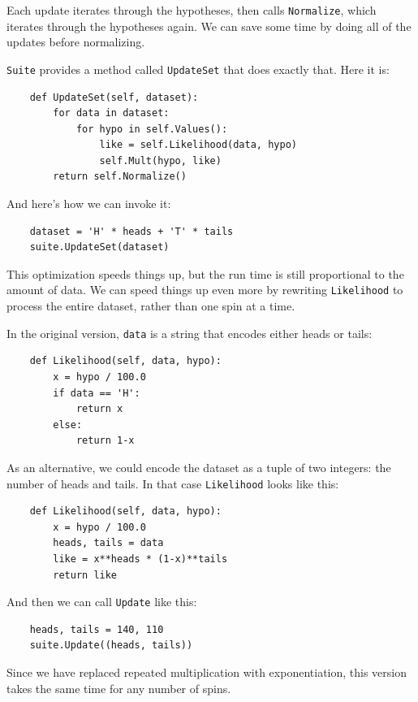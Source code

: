 \documentclass[12pt]{book}
\begin{document}
Each update iterates through the hypotheses, then calls \verb"Normalize",
which iterates through the hypotheses again.  We can save some
time by doing all of the updates before normalizing.

\verb"Suite" provides a method called \verb"UpdateSet" that does
exactly that.  Here it is:

\begin{verbatim}
    def UpdateSet(self, dataset):
        for data in dataset:
            for hypo in self.Values():
                like = self.Likelihood(data, hypo)
                self.Mult(hypo, like)
        return self.Normalize()
\end{verbatim}

And here's how we can invoke it:

\begin{verbatim}
    dataset = 'H' * heads + 'T' * tails
    suite.UpdateSet(dataset)
\end{verbatim}

This optimization speeds things up, but the run time is still
proportional to the amount of data.  We can speed things up
even more by rewriting \verb"Likelihood" to process the entire
dataset, rather than one spin at a time.

In the original version,
\verb"data" is a string that encodes either heads or tails:

\begin{verbatim}
    def Likelihood(self, data, hypo):
        x = hypo / 100.0
        if data == 'H':
            return x
        else:
            return 1-x
\end{verbatim}

As an alternative, we could encode the dataset as a tuple of 
two integers: the number of heads and tails.
In that case \verb"Likelihood" looks like this:

\begin{verbatim}
    def Likelihood(self, data, hypo):
        x = hypo / 100.0
        heads, tails = data
        like = x**heads * (1-x)**tails
        return like
\end{verbatim}

And then we can call \verb"Update" like this:

\begin{verbatim}
    heads, tails = 140, 110
    suite.Update((heads, tails))
\end{verbatim}

Since we have replaced repeated multiplication with exponentiation,
this version takes the same time for any number of spins.
\end{document}
